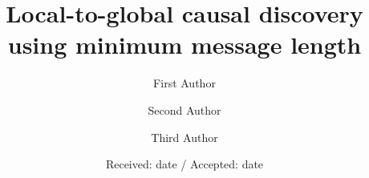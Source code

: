 \makeatletter
\newcommand*{\centernot}{%
  \mathpalette\@centernot
}
\def\@centernot#1#2{%
  \mathrel{%
    \rlap{%
      \settowidth\dimen@{$\m@th#1{#2}$}%
      \kern.5\dimen@
      \settowidth\dimen@{$\m@th#1=$}%
      \kern-.5\dimen@
      $\m@th#1\not$%
    }%
    {#2}%
  }%
}
\makeatother

%
%



\title{Local-to-global causal discovery using minimum message length%
}


\author{First Author         \and
        Second Author \and
        Third Author
}



\date{Received: date / Accepted: date}

\maketitle

